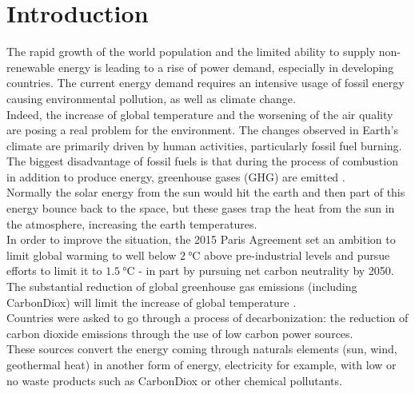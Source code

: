 \chapter{Introduction}

%
The rapid growth of the world population and the limited ability to supply non-renewable energy is leading to a rise of power demand, especially in developing countries. The current energy demand requires an intensive usage of fossil energy causing environmental pollution, as well as climate change. \\

Indeed, the increase of global temperature and the worsening of the air quality are posing a real problem for the environment. The changes observed in Earth’s climate are primarily driven by human activities, particularly fossil fuel burning. The biggest disadvantage of fossil fuels is that during the process of combustion in addition to produce energy, greenhouse gases (\gls{GHG}) are emitted \cite{greenhousegasemissions}. \\
Normally the solar energy from the sun would hit the earth and then part of this energy bounce back to the space, but these gases trap the heat from the sun in the atmosphere, increasing the earth temperatures. \\

In order to improve the situation, the 2015 Paris Agreement set an ambition to limit global warming to well below $\SI{2}{\degreeCelsius}$ above pre-industrial levels and pursue efforts to limit it to $\SI{1.5}{\degreeCelsius}$ - in part by pursuing net carbon neutrality by 2050. The substantial reduction of global greenhouse gas emissions (including \gls{CarbonDiox})  will limit the increase of global temperature \cite{french_conference}. \\
Countries were asked to go through a process of decarbonization: the reduction of carbon dioxide emissions through the use of low carbon power sources. \\
These sources convert the energy coming through naturals elements (sun, wind, geothermal heat) in another form of energy, electricity for example, with low or no waste products such as \gls{CarbonDiox} or other chemical pollutants. \\

